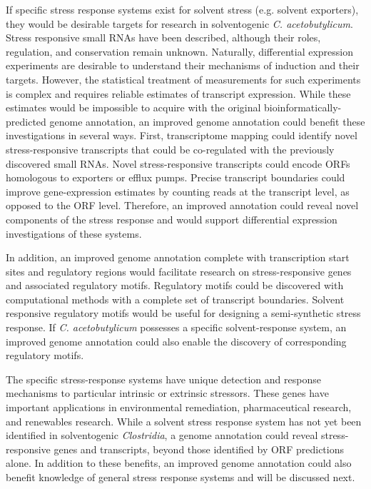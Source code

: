 If specific stress response systems exist for solvent stress (e.g. solvent exporters), they would be desirable targets for research in solventogenic \textit{C. acetobutylicum}. Stress responsive small RNAs have been described,\cite{39} although their roles, regulation, and conservation remain unknown. Naturally, differential expression experiments are desirable to understand their mechanisms of induction and their targets. However, the statistical treatment of measurements for such experiments is complex and requires reliable estimates of transcript expression.\cite{111,112,198} While these estimates would be impossible to acquire with the original bioinformatically-predicted genome annotation, an improved genome annotation could benefit these investigations in several ways. First, transcriptome mapping could identify novel stress-responsive transcripts that could be co-regulated with the previously discovered small RNAs.\cite{39} Novel stress-responsive transcripts could encode ORFs homologous to exporters or efflux pumps. Precise transcript boundaries could improve gene-expression estimates by counting reads at the transcript level, as opposed to the ORF level. Therefore, an improved annotation could reveal novel components of the stress response and would support differential expression investigations of these systems.

In addition, an improved genome annotation complete with transcription start sites and regulatory regions would facilitate research on stress-responsive genes and associated regulatory motifs. Regulatory motifs could be discovered with computational methods\cite{5,35} with a complete set of transcript boundaries.\cite{105,106,107} Solvent responsive regulatory motifs would be useful for designing a semi-synthetic stress response.\cite{45,46} If \textit{C. acetobutylicum} possesses a specific solvent-response system, an improved genome annotation could also enable the discovery of corresponding regulatory motifs.

The specific stress-response systems have unique detection and response mechanisms to particular intrinsic or extrinsic stressors. These genes have important applications in environmental remediation,\cite{128} pharmaceutical research,\cite{127} and renewables research. While a solvent stress response system has not yet been identified in solventogenic \textit{Clostridia}, a genome annotation could reveal stress-responsive genes and transcripts, beyond those identified by ORF predictions alone. In addition to these benefits, an improved genome annotation could also benefit knowledge of general stress response systems and will be discussed next. 


